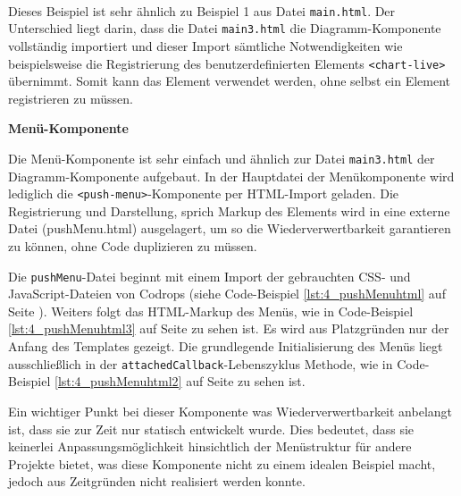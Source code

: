\begin{enumerate}




 \hfill \\
Dieses Beispiel ist sehr ähnlich zu Beispiel 1 aus Datei \lstinline|main.html|. Der Unterschied liegt darin, dass die Datei \lstinline|main3.html| die Diagramm-Komponente vollständig importiert und dieser Import sämtliche Notwendigkeiten wie beispielsweise die Registrierung des benutzerdefinierten Elements \lstinline|<chart-live>| übernimmt. Somit kann das Element verwendet werden, ohne selbst ein Element registrieren zu müssen.
\end{enumerate}

\textbf{Menü-Komponente}

Die Menü-Komponente ist sehr einfach und ähnlich zur Datei \lstinline|main3.html| der Diagramm-Komponente aufgebaut. In der Hauptdatei der Menükomponente wird lediglich die \lstinline|<push-menu>|-Komponente per HTML-Import geladen. Die Registrierung und Darstellung, sprich Markup des Elements wird in eine externe Datei (pushMenu.html) ausgelagert, um so die Wiederverwertbarkeit garantieren zu können, ohne Code duplizieren zu müssen.

Die \lstinline|pushMenu|-Datei beginnt mit einem Import der gebrauchten CSS- und JavaScript-Dateien von Codrops (siehe Code-Beispiel \ref{lst:4_pushMenuhtml} auf Seite \pageref{lst:4_pushMenuhtml}). Weiters folgt das HTML-Markup des Menüs, wie in Code-Beispiel \ref{lst:4_pushMenuhtml3} auf Seite \pageref{lst:4_pushMenuhtml3} zu sehen ist. Es wird aus Platzgründen nur der Anfang des Templates gezeigt. Die grundlegende Initialisierung des Menüs liegt ausschließlich in der \lstinline|attachedCallback|-Lebenszyklus Methode, wie in Code-Beispiel \ref{lst:4_pushMenuhtml2} auf Seite \pageref{lst:4_pushMenuhtml2} zu sehen ist.

Ein wichtiger Punkt bei dieser Komponente was Wiederverwertbarkeit anbelangt ist, dass sie zur Zeit nur statisch entwickelt wurde. Dies bedeutet, dass sie keinerlei Anpassungsmöglichkeit hinsichtlich der Menüstruktur für andere Projekte bietet, was diese Komponente nicht zu einem idealen Beispiel macht, jedoch aus Zeitgründen nicht realisiert werden konnte.

